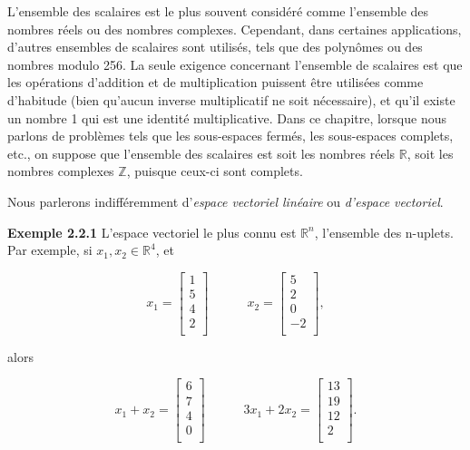 \documentclass[10pt,twoside,a4paper]{book}
\begin{document}
L'ensemble des scalaires est le plus souvent considéré comme l'ensemble des nombres réels ou des nombres complexes. Cependant, dans certaines applications, d'autres ensembles de scalaires sont utilisés, tels que des polynômes ou des nombres modulo 256. 
La seule exigence concernant l'ensemble de scalaires est que les opérations d'addition et de multiplication puissent être utilisées comme d'habitude (bien qu'aucun inverse multiplicatif ne soit nécessaire), et qu'il existe un nombre 1 qui est une identité multiplicative. 
Dans ce chapitre, lorsque nous parlons de problèmes tels que les sous-espaces fermés, les sous-espaces complets, etc., on suppose que l'ensemble des scalaires est soit les nombres réels $\mathbb{R}$, soit les nombres complexes $\mathbb{Z}$, puisque ceux-ci sont complets.

Nous parlerons indifféremment d'\textit{espace vectoriel linéaire} ou \textit{d'espace vectoriel}.

\vspace{4mm}
\noindent
\textbf{Exemple 2.2.1} L'espace vectoriel le plus connu est $\mathbb{R}^n$, l'ensemble des n-uplets. Par exemple, si $x_1, x_2 \in \mathbb{R}^4$, et

\begin{equation*}
  x_1 = \begin{bmatrix}
    1 \\
    5 \\
    4 \\
    2 \\
  \end{bmatrix}
  \quad \quad \quad
  x_2 = \begin{bmatrix}
    5 \\
    2 \\
    0 \\
    -2 \\
  \end{bmatrix},
\end{equation*}

alors

\begin{equation*}
  x_1 + x_2 = \begin{bmatrix}
    6 \\
    7 \\
    4 \\
    0 \\
  \end{bmatrix}
  \quad \quad \quad
  3x_1 + 2x_2 = \begin{bmatrix}
    13 \\
    19 \\
    12 \\
    2 \\
  \end{bmatrix}.
\end{equation*}
\end{document}
